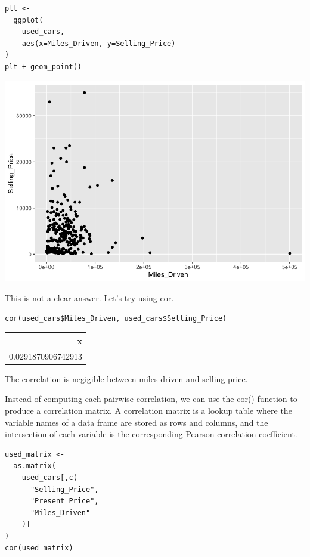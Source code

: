 \documentclass[11pt]{article}
\begin{document}
\begin{verbatim}
plt <-
  ggplot(
    used_cars,
    aes(x=Miles_Driven, y=Selling_Price)
)
plt + geom_point()
\end{verbatim}

\begin{org}
\begin{center}
\includegraphics[width=.9\linewidth]{./resources/cars_corr.png}
\end{center}
\end{org}

This is not a clear answer. Let's try using cor.

\begin{verbatim}
cor(used_cars$Miles_Driven, used_cars$Selling_Price)
\end{verbatim}

\begin{org}
\begin{center}
\begin{tabular}{r}
x\\
\hline
0.0291870906742913\\
\end{tabular}
\end{center}
\end{org}

The correlation is negigible between miles driven and selling price.

Instead of computing each pairwise correlation, we can use the cor() function to produce a correlation matrix. A correlation matrix is a lookup table where the variable names of a data frame are stored as rows and columns, and the intersection of each variable is the corresponding Pearson correlation coefficient.

\begin{verbatim}
used_matrix <-
  as.matrix(
    used_cars[,c(
      "Selling_Price",
      "Present_Price",
      "Miles_Driven"
    )]
)
cor(used_matrix)
\end{verbatim}
\end{document}
